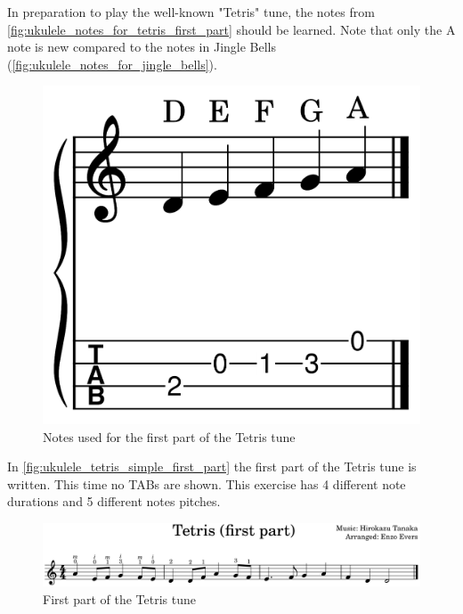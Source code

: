 \newpage

In preparation to play the well-known "Tetris" tune, the notes from \autoref{fig:ukulele_notes_for_tetris_first_part} should be learned. Note that only the A note is new compared to the notes in Jingle Bells (\autoref{fig:ukulele_notes_for_jingle_bells}).

\begin{figure}[h]
	\centering
	\includegraphics[height=0.12\textheight]{../../MuseScore/Ukulele/UkuleleNotesUsedInTetrisFirstPart.png}
	\caption{Notes used for the first part of the Tetris tune}
	\label{fig:ukulele_notes_for_tetris_first_part}
\end{figure}

In \autoref{fig:ukulele_tetris_simple_first_part} the first part of the Tetris tune is written. This time no TABs are shown. This exercise has 4 different note durations and 5 different notes pitches.

\begin{figure}[h]
	\centering
	\includegraphics[width=\textwidth]{../../MuseScore/Ukulele/UkuleleTetrisSimpleFirstPart.png}
	\caption{First part of the Tetris tune}
	\label{fig:ukulele_tetris_simple_first_part}
\end{figure}


